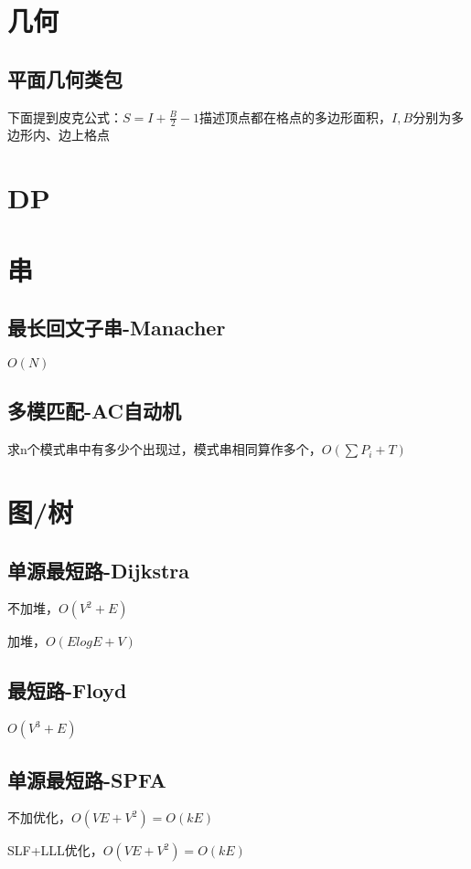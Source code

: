 \documentclass[10pt]{article}
\begin{document}
\section{几何}
\subsection{平面几何类包}
下面提到皮克公式：$S=I+\frac{B}{2}-1$描述顶点都在格点的多边形面积，$I, B$分别为多边形内、边上格点

\section{DP}
\section{串}
\subsection{最长回文子串-Manacher}
$O(N)$

\subsection{多模匹配-AC自动机}
求n个模式串中有多少个出现过，模式串相同算作多个，$O(\sum P_i+T)$

\section{图/树}
\subsection{单源最短路-Dijkstra}
不加堆，$O(V^2+E)$

加堆，$O(ElogE+V)$


\subsection{最短路-Floyd}
$O(V^3+E)$


\subsection{单源最短路-SPFA}
不加优化，$O(VE+V^2)=O(kE)$

SLF+LLL优化，$O(VE+V^2)=O(kE)$

\end{document}
